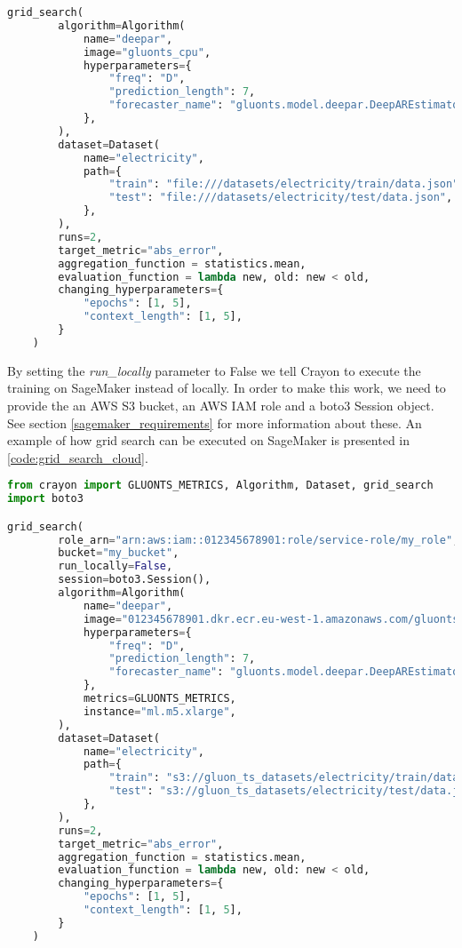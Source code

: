 \begin{lstlisting}[language=Python, label={code:grid_search_local}, caption=Grid search running locally.]
grid_search(
        algorithm=Algorithm(
            name="deepar",
            image="gluonts_cpu",
            hyperparameters={
                "freq": "D",
                "prediction_length": 7,
                "forecaster_name": "gluonts.model.deepar.DeepAREstimator",
            },
        ),
        dataset=Dataset(
            name="electricity",
            path={
                "train": "file:///datasets/electricity/train/data.json",
                "test": "file:///datasets/electricity/test/data.json",
            },
        ),
        runs=2,
        target_metric="abs_error",
        aggregation_function = statistics.mean, 
    	evaluation_function = lambda new, old: new < old,
        changing_hyperparameters={
        	"epochs": [1, 5],
        	"context_length": [1, 5],
    	}
    )
\end{lstlisting}

By setting the \textit{run\_locally} parameter to False we tell Crayon to execute the training on SageMaker instead of locally. In order to make this work, we need to provide the an AWS S3 bucket, an AWS IAM role and a boto3 Session object. See section \ref{sagemaker_requirements} for more information about these.
An example of how grid search can be executed on SageMaker is presented in \ref{code:grid_search_cloud}.

\begin{lstlisting}[language=Python, label={code:grid_search_cloud}, caption=Grid search running on SageMaker.]
from crayon import GLUONTS_METRICS, Algorithm, Dataset, grid_search
import boto3

grid_search(
        role_arn="arn:aws:iam::012345678901:role/service-role/my_role",
        bucket="my_bucket",
        run_locally=False,
        session=boto3.Session(),
        algorithm=Algorithm(
            name="deepar",
            image="012345678901.dkr.ecr.eu-west-1.amazonaws.com/gluonts/cpu",
            hyperparameters={
                "freq": "D",
                "prediction_length": 7,
                "forecaster_name": "gluonts.model.deepar.DeepAREstimator",
            },
            metrics=GLUONTS_METRICS,
            instance="ml.m5.xlarge",
        ),
        dataset=Dataset(
            name="electricity",
            path={
                "train": "s3://gluon_ts_datasets/electricity/train/data.json",
                "test": "s3://gluon_ts_datasets/electricity/test/data.json",
            },
        ),
        runs=2,
        target_metric="abs_error",
        aggregation_function = statistics.mean, 
        evaluation_function = lambda new, old: new < old,
        changing_hyperparameters={
        	"epochs": [1, 5],
        	"context_length": [1, 5],
    	}
    )
\end{lstlisting}
